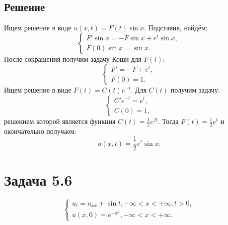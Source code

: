 \documentclass[11pt]{article}
\begin{document}
\subsection{Решение}
\label{sec:orgfab2742}
Ищем решение в виде $u(x, t) = F(t)\sin x$. Подставив, найдём:
\begin{equation*}
\begin{cases}
F'\sin x = -F\sin x + e^t\sin x, \\
F(0)\sin x = \sin x.
\end{cases}
\end{equation*}
После сокращения получим задачу Коши для $F(t)$:
\begin{equation}
\begin{cases}
F' = -F + e^t, \\
F(0) = 1.
\end{cases}
\end{equation}
Ищем решение в виде $F(t) = C(t)e^{-t}$. Для $C(t)$ получим задачу:
\begin{equation}
\begin{cases}
C'e^{-t} = e^t, \\
C(0) = 1,
\end{cases}
\end{equation}
решением которой является функция $C(t) = \frac12e^{2t}$. Тогда $F(t) = \frac12e^t$ и
окончательно получаем:
\begin{equation}
u(x, t) = \frac12e^t\sin x.
\end{equation}
\section{Задача 5.6}
\label{sec:org89f6004}
\begin{equation}
\begin{cases}
u_t = u_{xx} + \sin t, -\infty < x < +\infty, t > 0, \\
u(x, 0) = e^{-x^2}, -\infty < x < +\infty.
\end{cases}
\end{equation}
\end{document}
